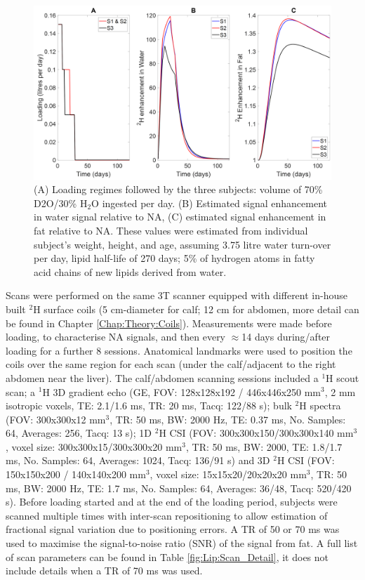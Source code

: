 \documentclass[class=article, crop=false]{standalone}
\begin{document}
\begin{figure}
    \centering
    \includegraphics[width=1\textwidth]{Figures/Lipid/Loading_Routine.png}
    \caption{(A) Loading regimes followed by the three subjects: volume of 70\% D2O/30\% H$_2$O ingested per day. (B) Estimated signal enhancement in water signal relative to NA, (C) estimated signal enhancement in fat relative to NA. These values were estimated from individual subject’s weight, height, and age, assuming 3.75 litre water turn-over per day, lipid half-life of 270 days\cite{Carnethon2002Serum19871998}; 5\% of hydrogen atoms in fatty acid chains of new lipids derived from water\cite{Turner2003MeasurementMIDA}.}
    \label{fig:Lip:Load}
\end{figure}

Scans were performed on the same 3T scanner equipped with different in-house built $^2$H surface coils (5 cm-diameter for calf; 12 cm for abdomen, more detail can be found in Chapter \ref{Chap:Theory:Coils}). Measurements were made before loading, to characterise NA signals, and then every $\approx$14 days during/after loading for a further 8 sessions. Anatomical landmarks were used to position the coils over the same region for each scan (under the calf/adjacent to the right abdomen near the liver). The calf/abdomen scanning sessions included a $^1$H scout scan; a $^1$H 3D gradient echo (GE, FOV: 128x128x192 / 446x446x250 mm$^3$, 2 mm isotropic voxels, TE: 2.1/1.6 ms, TR: 20 ms, Tacq: 122/88 s); bulk $^2$H spectra (FOV: 300x300x12 mm$^3$, TR: 50 ms, BW: 2000 Hz, TE: 0.37 ms, No. Samples: 64, Averages: 256, Tacq: 13 s); 1D $^2$H CSI (FOV: 300x300x150/300x300x140 mm$^3$, voxel size: 300x300x15/300x300x20 mm$^3$, TR: 50 ms, BW: 2000, TE: 1.8/1.7 ms, No. Samples: 64, Averages: 1024, Tacq: 136/91 s) and 3D $^2$H CSI (FOV: 150x150x200 / 140x140x200 mm$^3$, voxel size: 15x15x20/20x20x20 mm$^3$, TR: 50 ms, BW: 2000 Hz, TE: 1.7 ms, No. Samples: 64, Averages: 36/48, Tacq: 520/420 s). Before loading started and at the end of the loading period, subjects were scanned multiple times with inter-scan repositioning to allow estimation of fractional signal variation due to positioning errors. A TR of 50 or 70 ms was used to maximise the signal-to-noise ratio (SNR) of the signal from fat. A full list of scan parameters can be found in Table \ref{fig:Lip:Scan_Detail}, it does not include details when a TR of 70 ms was used.
\end{document}
